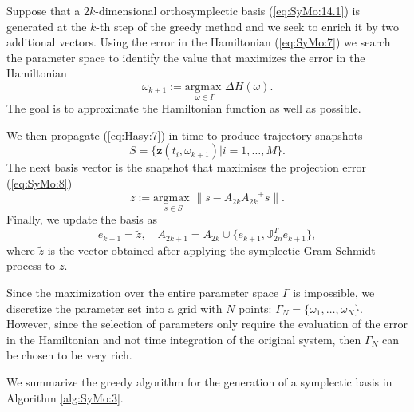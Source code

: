 Suppose that a $2k$-dimensional {\edit orthosymplectic basis (\ref{eq:SyMo:14.1})} is generated at the $k$-th step of the greedy method and we seek to enrich it by two additional vectors. Using the error in the Hamiltonian (\ref{eq:SyMo:7}) we search the parameter space to identify the value that maximizes the error in the Hamiltonian
\begin{equation} \label{eq:SyMo:14.5}
	\omega_{k+1} := \underset{\omega\in \Gamma}{\text{argmax }}\Delta H(\omega).
\end{equation}
The goal is to approximate the Hamiltonian function as well as possible. 

We then propagate (\ref{eq:Hasy:7}) in time to produce trajectory snapshots 
\begin{equation}
	S=\{ \mathbf z(t_i,\omega_{k+1}) | i = 1,\dots,M \}.
\end{equation} 
The next basis vector is the snapshot that maximises the projection error (\ref{eq:SyMo:8})
{\edit 
\begin{equation} \label{eq:SyMo:14.6}
	z := \underset{s\in S}{\text{argmax }} \| s - A_{2k}{A_{2k}}^+s \|.
\end{equation}
}
Finally, we update the basis as
{\edit
\begin{equation} \label{eq:SyMo:14.7}
	e_{k+1} = \tilde z, \quad A_{2k+1} = A_{2k}\cup \{ e_{k+1} , \mathbb J_{2n}^Te_{k+1} \},
\end{equation}
}
where $\tilde z$ is the vector obtained {\edit after} applying the symplectic Gram-Schmidt process to $z$. 

Since the maximization over the entire parameter space $\Gamma$ is impossible, we discretize the parameter set into a grid with $N$ points: $\Gamma_N = \{ \omega_1,\dots,\omega_N\}$. However, since the selection of parameters only require the evaluation of the error in the Hamiltonian and not time integration of the original system, then $\Gamma_N$ can be chosen {\edit to be} very rich.

We summarize the greedy algorithm for the generation of a symplectic basis in Algorithm \ref{alg:SyMo:3}.




